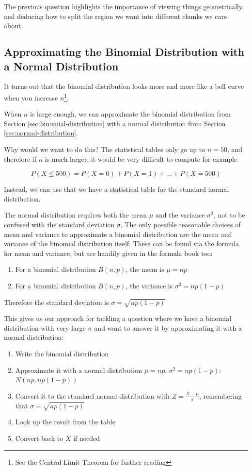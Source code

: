 The previous question highlights the importance of viewing things geometrically, and deducing how to split the region we want into different chunks we care about.



\subsection{Approximating the Binomial Distribution with a Normal Distribution}\label{sec:binomial-as-normal}

It turns out that the binomial distribution looks more and more like a bell curve when you increase $n$\footnote{See the Central Limit Theorem for further reading}.

When $n$ is large enough, we can approximate the binomial distribution from Section \ref{sec:binomial-distribution} with a normal distribution from Section \ref{sec:normal-distribution}.

Why would we want to do this? The statistical tables only go up to $n=50$, and therefore if $n$ is much larger, it would be very difficult to compute for example 

\[ P(X\leq 500) = P(X=0) + P(X=1) + \dots + P(X=500)\]

Instead, we can use that we have a statistical table for the standard normal distribution.

The normal distribution requires both the mean $\mu$ and the variance $\sigma^2$, not to be confused with the standard deviation $\sigma$. The only possible reasonable choices of mean and variance to approximate a binomial distribution 
are the mean and variance of the binomial distribution itself. These can be found via the formula for mean and variance, but are handily given in the formula book too:

\begin{enumerate}
    \item For a binomial distribution $B(n,p)$, the mean is $\mu = np$
    \item For a binomial distribution $B(n,p)$, the variance is $\sigma^2 = np(1-p)$
\end{enumerate}

Therefore the standard deviation is $\sigma = \sqrt{np(1-p)}$

This gives us our approach for tackling a question where we have a binomial distribution with very large $n$ and want to answer it by approximating it with a normal distribution:

\begin{enumerate}
    \item Write the binomial distribution 
    \item Approximate it with a normal distribution $\mu = np$, $\sigma^2 = np(1-p)$: $N(np,np(1-p))$ 
    \item Convert it to the standard normal distribution with $Z = \frac{X - \mu}{\sigma}$, remembering that $\sigma = \sqrt{np(1-p)}$
    \item Look up the result from the table
    \item Convert back to $X$ if needed
\end{enumerate}

